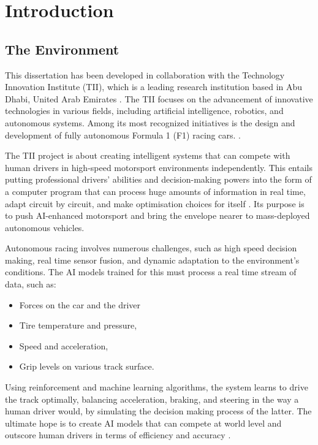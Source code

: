 \documentclass[a4paper,final,12pt]{report}
\begin{document}
\tableofcontents
\setlength{\parindent}{0pt}

\chapter{Introduction}
\section{The Environment}
This dissertation has been developed in collaboration with the Technology Innovation Institute (TII), which is a leading research institution based in Abu Dhabi, United Arab Emirates \cite{TII}. The TII focuses on the advancement of innovative technologies in various fields, including artificial intelligence, robotics, and autonomous systems. Among its most recognized initiatives is the design and development of fully autonomous Formula 1 (F1) racing cars. \cite{AutonomousRacing}.

The TII project is about creating intelligent systems that can compete with human drivers in high-speed motorsport environments independently. This entails putting professional drivers' abilities and decision-making powers into the form of a computer program that can process huge amounts of information in real time, adapt circuit by circuit, and make optimisation choices for itself \cite{AI_F1}. Its purpose is to push AI-enhanced motorsport and bring the envelope nearer to mass-deployed autonomous vehicles.

Autonomous racing involves numerous challenges, such as high speed decision making, real time sensor fusion, and dynamic adaptation to the environment's conditions. The AI models trained for this must process a real time stream of data, such as:
\begin{itemize}
    \item Forces on the car and the driver
    \item Tire temperature and pressure,
    \item Speed and acceleration,
    \item Grip levels on various track surface.
\end{itemize}
Using reinforcement and machine learning algorithms, the system learns to drive the track optimally, balancing acceleration, braking, and steering in the way a human driver would, by simulating the decision making process of the latter. The ultimate hope is to create AI models that can compete at world level and outscore human drivers in terms of efficiency and accuracy \cite{SelfDriving}.
\end{document}
